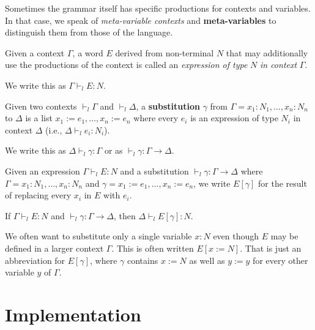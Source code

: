 \begin{remark}
Sometimes the grammar itself has specific productions for contexts and variables.
In that case, we speak of \emph{meta-variable contexts} and \textbf{meta-variables} to distinguish them from those of the language.
\end{remark}

\begin{definition}
Given a context $\Gamma$, a word $E$ derived from non-terminal $N$ that may additionally use the productions of the context is called an \emph{expression of type} $N$ \emph{in context} $\Gamma$.

We write this as $\Gamma\vdash_l E:N$.
\end{definition}

\begin{definition}[Substitution]
Given two contexts $\vdash_l \Gamma$ and $\vdash_l\Delta$, a \textbf{substitution} $\gamma$ from $\Gamma=x_1:N_1,\ldots,x_n:N_n$ to $\Delta$ is a list $x_1:=e_1,\ldots,x_n:=e_n$ where every $e_i$ is an expression of type $N_i$ in context $\Delta$ (i.e., $\Delta\vdash_l e_i:N_i$).

We write this as $\Delta\vdash_l \gamma:\Gamma$ or as $\vdash_l \gamma:\Gamma\to \Delta$.
\end{definition}

\begin{definition}\label{def:subapp}
Given an expression $\Gamma\vdash_l E:N$ and a substitution $\vdash_l\gamma:\Gamma\to\Delta$ where $\Gamma=x_1:N_1,\ldots,x_n:N_n$ and $\gamma=x_1:=e_1,\ldots,x_n:=e_n$, we write $E[\gamma]$ for the result of replacing every $x_i$ in $E$ with $e_i$.
\end{definition}

\begin{theorem}
If $\Gamma\vdash_l E:N$ and $\vdash_l\gamma:\Gamma\to\Delta$, then $\Delta\vdash_l E[\gamma]:N$.
\end{theorem}

We often want to substitute only a single variable $x:N$ even though $E$ may be defined in a larger context $\Gamma$.
This is often written $E[x:=N]$.
That is just an abbreviation for $E[\gamma]$, where $\gamma$ contains $x:=N$ as well as $y:=y$ for every other variable $y$ of $\Gamma$.


\section{Implementation}

